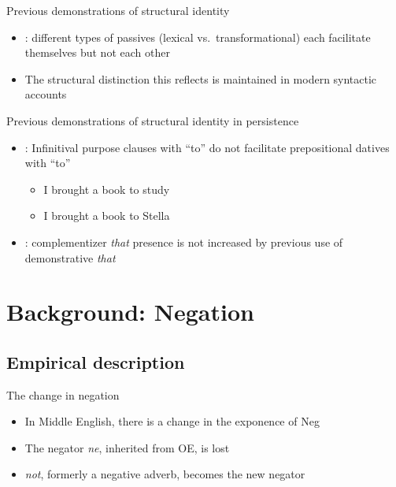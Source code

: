 \documentclass{digs-slides}
\newcommand{\includegraph}[1]{\mode<beamer>{}
    \mode<handout>{}}
\begin{document}
\begin{frame}{Previous demonstrations of structural identity}
	\begin{itemize}
          \item \textcite{Estival:1985}: different types of passives (lexical vs.\ transformational) each facilitate themselves but not each other
          \item The structural distinction this reflects is maintained in modern syntactic accounts \parencite[e.g.][]{Embick:2004}
	\end{itemize}
        \begin{center}
            \includegraph{figures/estival}
        \end{center}
\end{frame}

\begin{frame}{Previous demonstrations of structural identity in persistence} %
	\begin{itemize}
          \item \textcite{Bock:1990}: Infinitival purpose clauses with
            “to” do not facilitate prepositional datives with “to”
            \begin{itemize}
              \item I brought a book to study
              \item I brought a book to Stella
            \end{itemize}
          \item \textcite{Ferreira:2003}: complementizer \textit{that}
            presence is not increased by previous use of demonstrative \textit{that}
	\end{itemize}
\end{frame}



\section{Background: Negation}

\subsection{Empirical description}
\label{sec:empirical-aspects}

\begin{frame}{The change in negation}
    \begin{itemize}
      \item In Middle English, there is a change in the exponence of Neg
      \item The negator \emph{ne}, inherited from OE, is lost
      \item \emph{not}, formerly a negative adverb, becomes the new negator
    \end{itemize}
\end{frame}
\end{document}
